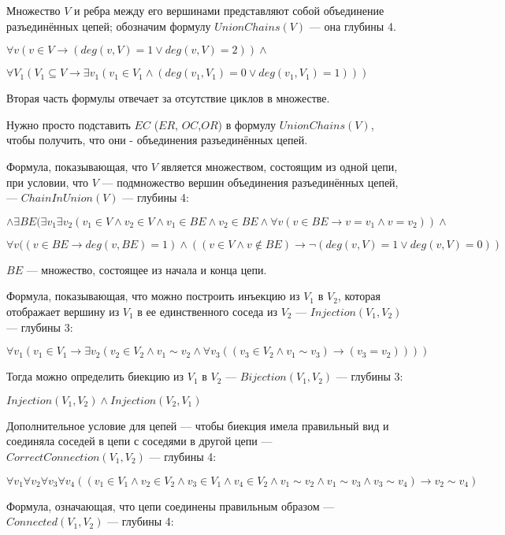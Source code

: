 \documentclass{article}
\begin{document}
Множество $V$ и ребра между его вершинами представляют собой объединение разъединённых цепей; обозначим формулу $UnionChains(V)$ --- она глубины 4.

$\forall v (v \in V \rightarrow (deg (v, V) = 1 \lor deg(v, V) = 2)) \land $

$\forall V_1 (V_1 \subseteq V \rightarrow \exists v_1 (v_1 \in V_1 \land (deg (v_1, V_1) = 0 \lor deg (v_1, V_1) = 1)))$

Вторая часть формулы отвечает за отсутствие циклов в множестве.

Нужно просто подставить $EC$ ($ER$, $OC$,$OR$) в формулу $UnionChains(V)$, чтобы получить,
что они - объединения разъединённых цепей.

Формула, показывающая, что $V$ является множеством, состоящим из одной цепи, при условии, что $V$ --- подмножество вершин объединения разъединённых цепей, --- $ChainInUnion(V)$ --- глубины 4:

$\land \exists BE (\exists v_1 \exists v_2 (v_1 \in V \land v_2 \in V \land v_1 \in BE \land v_2 \in BE \land
\forall v (v \in BE \rightarrow v = v_1 \land v = v_2)) \land$

$\forall v ((v \in BE \rightarrow deg(v, BE) = 1) \land ((v \in V \land v \notin BE) \rightarrow
\neg(deg(v,V) = 1 \lor deg(v, V) = 0))$

$BE$ --- множество, состоящее из начала и конца цепи.

Формула, показывающая, что можно построить инъекцию из $V_1$ в $V_2$, которая
отображает вершину из $V_1$ в ее единственного соседа из $V_2$ --- $Injection(V_1, V_2)$ --- глубины 3:

$\forall v_1 (v_1 \in V_1 \rightarrow \exists v_2 (v_2 \in V_2 \land v_1 \sim v_2 \land
\forall v_3 ((v_3 \in V_2 \land v_1 \sim v_3) \rightarrow (v_3 = v_2))))$

Тогда можно определить биекцию из $V_1$ в $V_2$ --- $Bijection(V_1, V_2)$ --- глубины 3:

$Injection(V_1, V_2) \land Injection(V_2, V_1)$

Дополнительное условие для цепей --- чтобы биекция имела правильный вид и соединяла соседей в цепи с соседями в другой цепи --- $CorrectConnection(V_1, V_2)$ --- глубины 4:

$\forall v_1 \forall v_2 \forall v_3 \forall v_4 ((v_1 \in V_1 \land v_2 \in V_2 \land v_3 \in V_1
\land v_4 \in V_2 \land v_1 \sim v_2 \land v_1 \sim v_3 \land v_3 \sim v_4) \rightarrow v_2 \sim v_4)$

Формула, означающая, что цепи соединены правильным образом --- $Connected(V_1, V_2)$ --- глубины 4:
\end{document}
